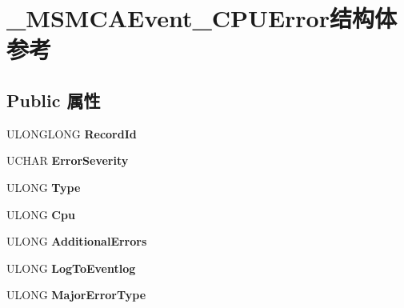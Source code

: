 \hypertarget{struct___m_s_m_c_a_event___c_p_u_error}{}\section{\+\_\+\+M\+S\+M\+C\+A\+Event\+\_\+\+C\+P\+U\+Error结构体 参考}
\label{struct___m_s_m_c_a_event___c_p_u_error}
\subsection*{Public 属性}
\begin{DoxyCompactItemize}
\item 
\mbox{\label{struct___m_s_m_c_a_event___c_p_u_error_a4fce9fdd25a45f852138e13974d5f407}} 
U\+L\+O\+N\+G\+L\+O\+NG {\bfseries Record\+Id}
\item 
\mbox{\label{struct___m_s_m_c_a_event___c_p_u_error_add32a2374b23495dfcfb5a6b5b622055}} 
U\+C\+H\+AR {\bfseries Error\+Severity}
\item 
\mbox{\label{struct___m_s_m_c_a_event___c_p_u_error_abd088b565e0f8dd39b5b727354291764}} 
U\+L\+O\+NG {\bfseries Type}
\item 
\mbox{\label{struct___m_s_m_c_a_event___c_p_u_error_ad6006a6bda2efceae28c5c2d16bb9b9c}} 
U\+L\+O\+NG {\bfseries Cpu}
\item 
\mbox{\label{struct___m_s_m_c_a_event___c_p_u_error_afd7b6c86a1cdf9cbbd1fb92db19c5057}} 
U\+L\+O\+NG {\bfseries Additional\+Errors}
\item 
\mbox{\label{struct___m_s_m_c_a_event___c_p_u_error_a11c4d23eba031f8696f7e929649ce233}} 
U\+L\+O\+NG {\bfseries Log\+To\+Eventlog}
\item 
\mbox{\label{struct___m_s_m_c_a_event___c_p_u_error_aeadbe99ac50856f0af97f7c6bb8f69ae}} 
U\+L\+O\+NG {\bfseries Major\+Error\+Type}
\item 
\mbox{\label{struct___m_s_m_c_a_event___c_p_u_error_a89c4d7ce1afaff789bbd52041cb1b297}} 

\end{DoxyCompactItemize}
